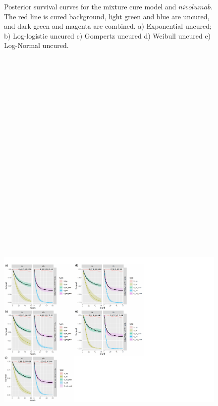 \documentclass[
]{article}
\begin{document}
\begin{figure}
{}

\caption{\label{fig:NIVO}Posterior survival curves for the mixture cure model and $nivolumab$. The red line is cured background, light green and blue are uncured, and dark green and magenta are combined. a) Exponential uncured; b) Log-logistic uncured c) Gompertz uncured d) Weibull uncured e) Log-Normal uncured.}\label{fig:unnamed-chunk-4}
\end{figure}

\begin{figure}

{\centering \includegraphics[width=25cm,height=40cm]{Check_mate_analysis_files/figure-latex/unnamed-chunk-5-1} 

}
\end{figure}
\end{document}
